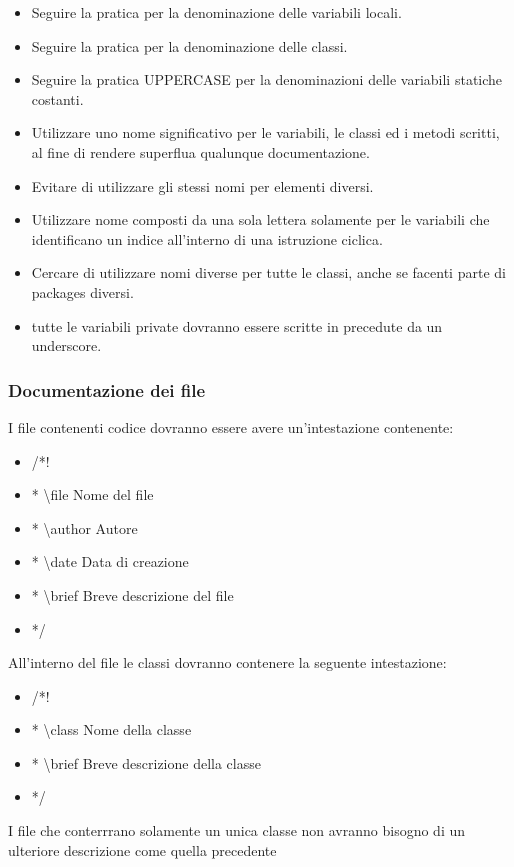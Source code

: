 \begin{itemize}
\item Seguire la pratica  per la denominazione delle variabili locali.
\item Seguire la pratica  per la denominazione delle classi.
\item Seguire la pratica UPPER\textunderscore CASE per la denominazioni delle variabili statiche costanti.
\item Utilizzare uno nome significativo per le variabili, le classi ed i metodi scritti, al fine di rendere superflua qualunque documentazione.
\item Evitare di utilizzare gli stessi nomi per elementi diversi.
\item Utilizzare nome composti da una sola lettera solamente per le variabili che identificano un indice all'interno di una istruzione ciclica.
\item Cercare di utilizzare nomi diverse per tutte le classi, anche se facenti parte di packages diversi.
\item tutte le variabili private dovranno essere scritte in  precedute da un underscore.
\end{itemize}


\subsubsection{Documentazione dei file}
I file contenenti codice dovranno essere avere un’intestazione contenente:
\begin{itemize}
\color{ForestGreen}
\item /*! 
\item *   \textbackslash file Nome del file
\item *   \textbackslash author Autore
\item *   \textbackslash date Data di creazione
\item *   \textbackslash brief Breve descrizione del file
\item */
\end{itemize}

All'interno del file le classi dovranno contenere la seguente intestazione:
\begin{itemize}
\color{ForestGreen}
\item /*!
\item * \textbackslash class Nome della classe
\item * \textbackslash brief Breve descrizione della classe
\item */
\end{itemize}
I file che conterrrano solamente un unica classe non avranno bisogno di un ulteriore descrizione come quella precedente

